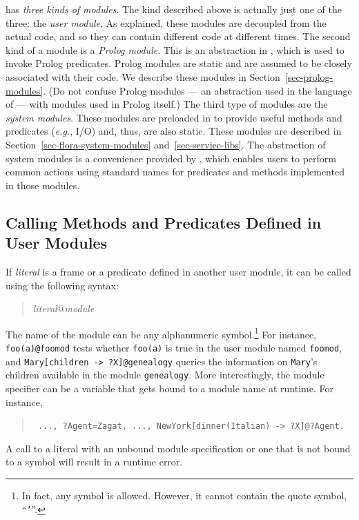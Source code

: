 \documentclass[11pt]{article}
\newcommand{\ERGO}{\mbox{\smaller{\ensuremath{\cal{E}}\smaller{{\sc{RGO}}}}}\xspace}
\newcommand{\FLSYSTEM}{\ERGO}
\newcommand{\mvd}{{\mbox{\tt \,->\,}}}  %
\begin{document}
\FLSYSTEM has \emph{three kinds of modules}.
The kind described above is actually just one of the three:
the \emph{user module}. As explained, these modules are decoupled from the
actual code, and so they can contain different code at different times.
The second kind of a module
is a \emph{Prolog module}. This is an abstraction in \FLSYSTEM,
which is used to invoke Prolog predicates. Prolog modules are static and are
assumed to be closely associated with their code. We describe these modules
in Section~\ref{sec-prolog-modules}. (Do not confuse \FLSYSTEM Prolog modules
--- an abstraction used in the language of \FLSYSTEM --- with modules used
in Prolog itself.)  The third type of modules are the
\emph{\FLSYSTEM system modules}. These modules are preloaded in \FLSYSTEM
to provide useful methods and predicates ({\it e.g.}, I/O) and,
thus, are also static. These modules are described in
Section~\ref{sec-flora-system-modules} and~\ref{sec-service-libs}. The
abstraction of system modules is a convenience provided by \FLSYSTEM, which
enables users to perform common actions using standard names for
predicates and methods implemented in those modules.


\subsection{Calling Methods and Predicates Defined in User Modules}


%
If \emph{literal} is a frame or a predicate defined in another
user module, it can be called using the following syntax:
\begin{quote}
\emph{literal}@\emph{module} 
\end{quote}
The name of the module can be any alphanumeric symbol.\footnote{
  In fact, any symbol is allowed. However, it cannot contain the quote
  symbol, ``{\tt '}''.
  }
For instance, \verb|foo(a)@foomod| tests whether {\tt foo(a)} is true in
the user module named {\tt foomod}, and {\tt Mary[children\mvd ?X]@genealogy}
queries the information on {\tt Mary}'s children available in the module
{\tt genealogy}. More interestingly, the module specifier can be a variable
that gets bound to a module name at runtime. For instance, 
\begin{quote}
 {\tt
   ..., ?Agent=Zagat, ..., NewYork[dinner(Italian)\mvd ?X]@?Agent.
   }
\end{quote}
A call to a literal with an unbound module specification or one that is not
bound to a symbol will result in a runtime error.
\end{document}
